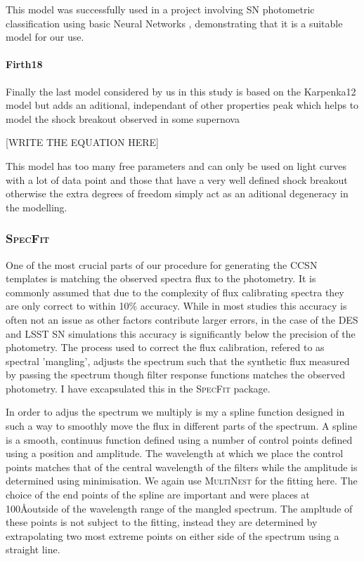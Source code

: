 This model was successfully used in a project involving SN photometric classification using basic Neural Networks \citep{Karpenka2012}, demonstrating that it is a suitable model for our use.

\paragraph{Firth18}
Finally the last model considered by us in this study is based on the Karpenka12 model but adds an aditional, independant of other properties peak which helps to model the shock breakout observed in some supernova

[WRITE THE EQUATION HERE]

This model has too many free parameters and can only be used on light curves with a lot of data point and those that have a very well defined shock breakout otherwise the extra degrees of freedom simply act as an aditional degeneracy in the modelling.

\subsubsection{\textsc{SpecFit}}
One of the most crucial parts of our procedure for generating the CCSN templates is matching the observed spectra flux to the photometry. It is commonly assumed that due to the complexity of flux calibrating spectra they are only correct to within 10\% accuracy. While in most studies this accuracy is often not an issue as other factors contribute larger errors, in the case of the DES and LSST SN simulations this accuracy is significantly below the precision of the photometry. The process used to correct the flux calibration, refered to as spectral 'mangling', adjusts the spectrum such that the synthetic flux measured by passing the spectrum though filter response functions matches the observed photometry. I have excapsulated this in the \textsc{SpecFit} package.

In order to adjus the spectrum we multiply is my a spline function designed in such a way to smoothly move the flux in different parts of the spectrum. A spline is a smooth, continuus function defined using a number of control points defined using a position and amplitude. The wavelength at which we place the control points matches that of the central wavelength of the filters while the amplitude is determined using minimisation. We again use \textsc{MultiNest} for the fitting here. The choice of the end points of the spline are important and were places at 100\AA outside of the wavelength range of the mangled spectrum. The ampltude of these points is not subject to the fitting, instead they are determined by extrapolating two most extreme points on either side of the spectrum using a straight line.

